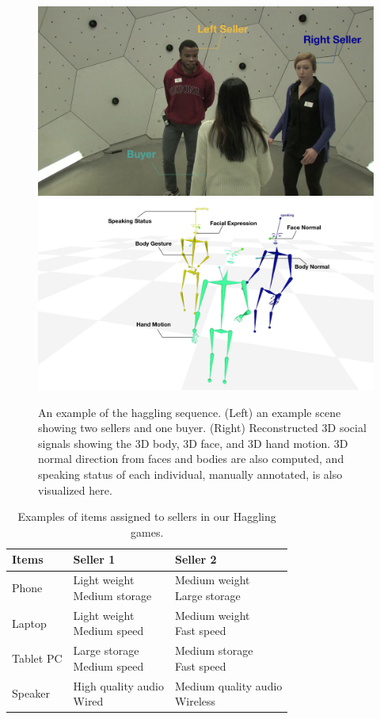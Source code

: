 \begin{figure}
	\centering
	\includegraphics[trim=300 0 0 0,clip,width=0.49\linewidth]{ssp_fig/haggling_ex_input}
	\includegraphics[trim=300 0 0 0,clip,width=0.49\linewidth]{ssp_fig/haggling_ex_measure}
	\caption{An example of the haggling sequence. (Left) an example scene showing two sellers and one buyer. (Right) Reconstructed 3D social signals showing the 3D body, 3D face, and 3D hand motion. 3D normal direction from faces and bodies are also computed, and speaking status of each individual, manually annotated, is also visualized here.} 
	\label{fig:haggling_example}
\end{figure}

\begin{table}[h]
	\centering
	
	\begin{tabular}{ l| l | l  }
		\hline	
		Items & Seller 1  &  Seller 2\\
		\hline	
		\hline	
		Phone &  \makecell{Light weight \\ Medium storage}    & \makecell{Medium weight\\ Large storage}\\
		\hline			
		Laptop &  \makecell{Light weight \\ Medium speed}    & \makecell{Medium weight\\ Fast speed}\\
		\hline			
		Tablet PC &  \makecell{Large storage\\ Medium speed}    & \makecell{Medium storage\\ Fast speed}\\
		\hline	
		Speaker &  \makecell{High quality audio\\ Wired}    & \makecell{Medium quality audio\\ Wireless}\\
		\hline	
	\end{tabular}
	\caption{Examples of items assigned to sellers in our Haggling games.}
	\label{table:haggling_items}
\end{table}


